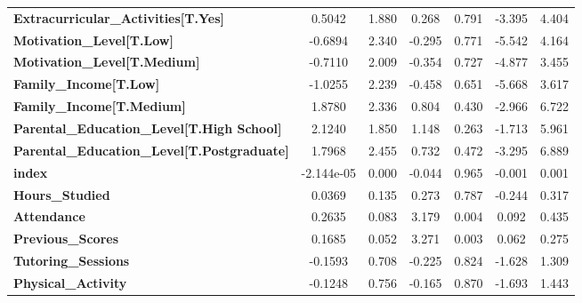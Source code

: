\documentclass[11pt]{article}
\begin{document}
\begin{center}
\begin{tabular}{lcccccc}
\textbf{Extracurricular\_Activities[T.Yes]}         &       0.5042  &        1.880     &     0.268  &         0.791        &       -3.395    &        4.404     \\
\textbf{Motivation\_Level[T.Low]}                   &      -0.6894  &        2.340     &    -0.295  &         0.771        &       -5.542    &        4.164     \\
\textbf{Motivation\_Level[T.Medium]}                &      -0.7110  &        2.009     &    -0.354  &         0.727        &       -4.877    &        3.455     \\
\textbf{Family\_Income[T.Low]}                      &      -1.0255  &        2.239     &    -0.458  &         0.651        &       -5.668    &        3.617     \\
\textbf{Family\_Income[T.Medium]}                   &       1.8780  &        2.336     &     0.804  &         0.430        &       -2.966    &        6.722     \\
\textbf{Parental\_Education\_Level[T.High School]}  &       2.1240  &        1.850     &     1.148  &         0.263        &       -1.713    &        5.961     \\
\textbf{Parental\_Education\_Level[T.Postgraduate]} &       1.7968  &        2.455     &     0.732  &         0.472        &       -3.295    &        6.889     \\
\textbf{index}                                      &   -2.144e-05  &        0.000     &    -0.044  &         0.965        &       -0.001    &        0.001     \\
\textbf{Hours\_Studied}                             &       0.0369  &        0.135     &     0.273  &         0.787        &       -0.244    &        0.317     \\
\textbf{Attendance}                                 &       0.2635  &        0.083     &     3.179  &         0.004        &        0.092    &        0.435     \\
\textbf{Previous\_Scores}                           &       0.1685  &        0.052     &     3.271  &         0.003        &        0.062    &        0.275     \\
\textbf{Tutoring\_Sessions}                         &      -0.1593  &        0.708     &    -0.225  &         0.824        &       -1.628    &        1.309     \\
\textbf{Physical\_Activity}                         &      -0.1248  &        0.756     &    -0.165  &         0.870        &       -1.693    &        1.443     \\

\end{tabular}
\end{center}
\end{document}
